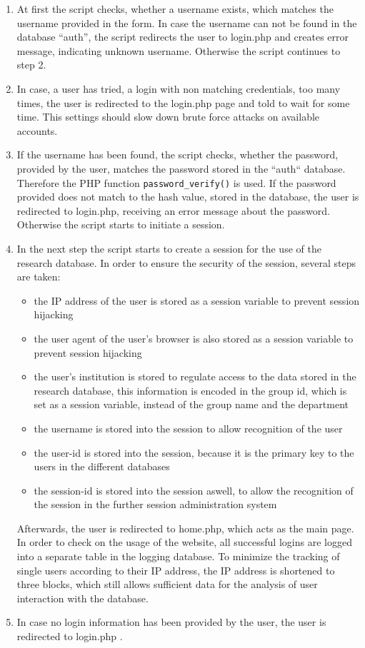 \begin{enumerate}
 \item At first the script checks, whether a username exists, which matches the username provided in the form. In case the username can not be found in the database ``auth'', the script
 redirects the user to login.php and creates error message, indicating unknown username. Otherwise the script continues to step 2.
 \item In case, a user has tried, a login with non matching credentials, too many times, the user is redirected to the login.php page and told to wait for some time. This settings 
 should slow down brute force attacks on available accounts.
 \item If the username has been found, the script checks, whether the password, provided by the user, matches the password stored in the ``auth`` database. Therefore the PHP function 
 \texttt{password\_verify()} is used. If the password provided does not match to the hash value, stored in the database, the user is redirected to login.php, receiving an error message about the 
 password. Otherwise the script starts to initiate a session.
 \item In the next step the script starts to create a session for the use of the research database. In order to ensure the security of the session, several steps are taken:
 \begin{itemize}
  \item the IP address of the user is stored as a session variable to prevent session hijacking
  \item the user agent of the user's browser is also stored as a session variable to prevent session hijacking
  \item the user's institution is stored to regulate access to the data stored in the research database, this information is encoded in the group id, which is set as a session
  variable, instead of the group name and the department
  \item the username is stored into the session to allow recognition of the user 
  \item the user-id is stored into the session, because it is the primary key to the users in the different databases
  \item the session-id is stored into the session aswell, to allow the recognition of the session in the further session administration system
 \end{itemize}
  Afterwards, the user is redirected to home.php, which acts as the main page. In order to check on the usage of the website, all successful logins are logged into a separate 
  table in the logging database. To minimize the tracking of single users according to their IP address, the IP address is shortened to three blocks, which still allows sufficient 
  data for the analysis of user interaction with the database.
  \item In case no login information has been provided by the user, the user is redirected to login.php .\\
\end{enumerate}
